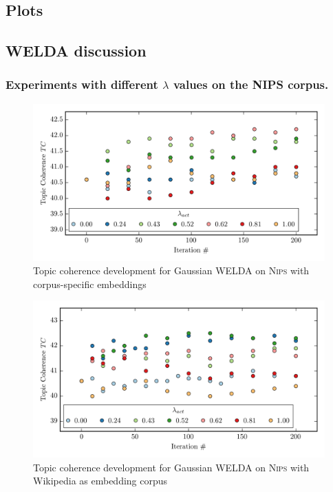\documentclass[
        a4paper,
        titlepage,
        twoside,
        parskip,
        numbers=noenddot
        ]{scrbook}
\theoremstyle{break}
\begin{document}
\begin{appendices}
\chapter{Plots}
  \section{WELDA discussion}
  \subsection{Experiments with different $\lambda$ values on the N{\footnotesize IPS} corpus.}
  \label{sec:appendix_nips_lambda}
  \begin{figure}[H]
         \centering
         \includegraphics[width=\textwidth]{figures/welda_gaussian_nips_50.png}
         \caption{Topic coherence development for Gaussian WELDA on \textsc{Nips} with corpus-specific embeddings}
         \label{fig:welda_gaussian_nips_50}
  \end{figure}
  \begin{figure}[H]
         \centering
         \includegraphics[width=\textwidth]{figures/welda_gaussian_nips_200.png}
         \caption{Topic coherence development for Gaussian WELDA on \textsc{Nips} with Wikipedia as embedding corpus}
         \label{fig:welda_gaussian_nips_200}
  \end{figure}


\end{appendices}
\end{document}
